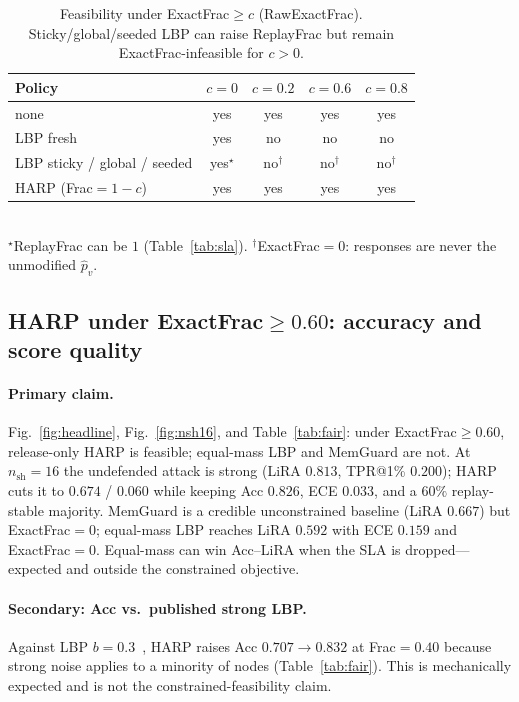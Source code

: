 \documentclass[conference]{IEEEtran}
\begin{document}
\begin{table}[!t]
\caption{Feasibility under ExactFrac$\ge c$ (RawExactFrac). Sticky/global/seeded LBP can raise ReplayFrac but remain ExactFrac-infeasible for $c{>}0$.}
\label{tab:feas}
\centering
\scriptsize
\begin{tabular}{@{}lcccc@{}}
\toprule
\textbf{Policy} & $c{=}0$ & $c{=}0.2$ & $c{=}0.6$ & $c{=}0.8$ \\
\midrule
none & yes & yes & yes & yes \\
LBP fresh & yes & no & no & no \\
LBP sticky / global / seeded & yes$^\star$ & no$^\dagger$ & no$^\dagger$ & no$^\dagger$ \\
HARP (Frac${=}1-c$) & yes & yes & yes & yes \\
\bottomrule
\end{tabular}\\[2pt]
{\footnotesize $^\star$ReplayFrac can be $1$ (Table~\ref{tab:sla}).
$^\dagger$ExactFrac${=}0$: responses are never the unmodified $\hat p_v$.}
\end{table}

\subsection{HARP under ExactFrac$\ge 0.60$: accuracy and score quality}
\label{sec:harp-results}
\paragraph{Primary claim.}
Fig.~\ref{fig:headline}, Fig.~\ref{fig:nsh16}, and Table~\ref{tab:fair}: under ExactFrac$\ge 0.60$, release-only HARP is feasible; equal-mass LBP and MemGuard are not.
At $n_{\mathrm{sh}}{=}16$ the undefended attack is strong (LiRA $0.813$, TPR@1\% $0.200$); HARP cuts it to $0.674$ / $0.060$ while keeping Acc $0.826$, ECE $0.033$, and a $60\%$ replay-stable majority.
MemGuard is a credible unconstrained baseline (LiRA $0.667$) but ExactFrac${=}0$; equal-mass LBP reaches LiRA $0.592$ with ECE $0.159$ and ExactFrac${=}0$.
Equal-mass can win Acc--LiRA when the SLA is dropped---expected and outside the constrained objective.

\paragraph{Secondary: Acc vs.\ published strong LBP.}
Against LBP $b{=}0.3$~\cite{olatunji2021mia}, HARP raises Acc $0.707\rightarrow 0.832$ at Frac${=}0.40$ because strong noise applies to a minority of nodes (Table~\ref{tab:fair}).
This is mechanically expected and is not the constrained-feasibility claim.
\end{document}
